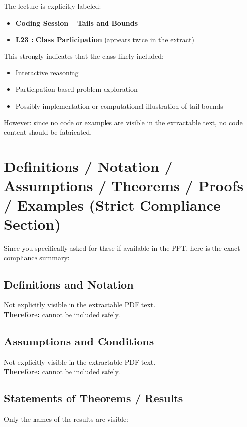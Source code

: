 \documentclass[11pt]{article}
\begin{document}
The lecture is explicitly labeled:

\begin{itemize}
    \item \textbf{Coding Session -- Tails and Bounds}
    \item \textbf{L23 : Class Participation} (appears twice in the extract)
\end{itemize}

This strongly indicates that the class likely included:

\begin{itemize}
    \item Interactive reasoning
    \item Participation-based problem exploration
    \item Possibly implementation or computational illustration of tail bounds
\end{itemize}

However: since no code or examples are visible in the extractable text, no code content should be fabricated.

\section{Definitions / Notation / Assumptions / Theorems / Proofs / Examples (Strict Compliance Section)}

Since you specifically asked for these if available in the PPT, here is the exact compliance summary:

\subsection{Definitions and Notation}
Not explicitly visible in the extractable PDF text. \\
\textbf{Therefore:} cannot be included safely.

\subsection{Assumptions and Conditions}
Not explicitly visible in the extractable PDF text. \\
\textbf{Therefore:} cannot be included safely.

\subsection{Statements of Theorems / Results}
Only the names of the results are visible:
\end{document}
